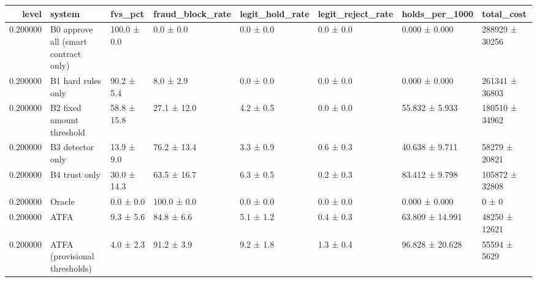 \begin{tabular}{rlllllll}
\toprule
level & system & fvs\_pct & fraud\_block\_rate & legit\_hold\_rate & legit\_reject\_rate & holds\_per\_1000 & total\_cost \\
\midrule
0.200000 & B0 approve all (smart contract only) & 100.0 ± 0.0 & 0.0 ± 0.0 & 0.0 ± 0.0 & 0.0 ± 0.0 & 0.000 ± 0.000 & 288929 ± 30256 \\
0.200000 & B1 hard rules only & 90.2 ± 5.4 & 8.0 ± 2.9 & 0.0 ± 0.0 & 0.0 ± 0.0 & 0.000 ± 0.000 & 261341 ± 36803 \\
0.200000 & B2 fixed amount threshold & 58.8 ± 15.8 & 27.1 ± 12.0 & 4.2 ± 0.5 & 0.0 ± 0.0 & 55.832 ± 5.933 & 180510 ± 34962 \\
0.200000 & B3 detector only & 13.9 ± 9.0 & 76.2 ± 13.4 & 3.3 ± 0.9 & 0.6 ± 0.3 & 40.638 ± 9.711 & 58279 ± 20821 \\
0.200000 & B4 trust only & 30.0 ± 14.3 & 63.5 ± 16.7 & 6.3 ± 0.5 & 0.2 ± 0.3 & 83.412 ± 9.798 & 105872 ± 32808 \\
0.200000 & Oracle & 0.0 ± 0.0 & 100.0 ± 0.0 & 0.0 ± 0.0 & 0.0 ± 0.0 & 0.000 ± 0.000 & 0 ± 0 \\
0.200000 & ATFA & 9.3 ± 5.6 & 84.8 ± 6.6 & 5.1 ± 1.2 & 0.4 ± 0.3 & 63.809 ± 14.991 & 48250 ± 12621 \\
0.200000 & ATFA (provisional thresholds) & 4.0 ± 2.3 & 91.2 ± 3.9 & 9.2 ± 1.8 & 1.3 ± 0.4 & 96.828 ± 20.628 & 55594 ± 5629 \\
\bottomrule
\end{tabular}
